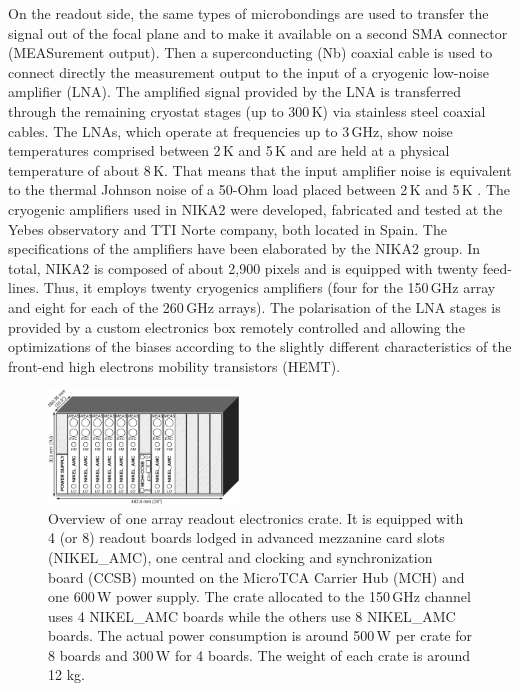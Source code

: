 \documentclass[]{aa} %
\begin{document}
On the readout side, the same types of microbondings are used to transfer the signal out of the focal plane and to make it available on a second SMA connector (MEASurement output). Then a superconducting (Nb) coaxial cable is used to connect directly the measurement output to the input of a cryogenic low-noise amplifier (LNA). The amplified signal provided by the LNA is transferred through the remaining cryostat stages (up to 300\,K) via stainless steel coaxial cables. The LNAs, which operate at frequencies up to 3\,GHz, show noise temperatures comprised between 2\,K and 5\,K and are held at a physical temperature of about 8\,K. That means that the input amplifier noise is equivalent to the thermal Johnson noise of a 50-Ohm load placed between 2\,K and 5\,K . The cryogenic amplifiers used in NIKA2 were developed, fabricated and tested at the Yebes observatory and TTI Norte company, both located in Spain. The specifications of the amplifiers have been elaborated by the NIKA2 group. In total, NIKA2 is composed of about 2,900 pixels and is equipped with twenty feed-lines. Thus, it employs twenty cryogenics amplifiers (four for the 150\,GHz array and eight for each of the 260\,GHz arrays). The polarisation of the LNA stages is provided by a custom electronics box remotely controlled and allowing the optimizations of the biases according to the slightly different characteristics of the front-end high electrons mobility transistors (HEMT). 

\begin{figure}
\begin{center}
\includegraphics[angle=0,width=0.45\textwidth]{NIKA_crate}
\caption{Overview of one array readout electronics crate.
It is equipped with 4 (or 8) readout boards lodged in advanced mezzanine card slots (NIKEL\_AMC), one central and clocking and synchronization board (CCSB) mounted on the MicroTCA Carrier Hub (MCH) and one 600\,W power supply.
The crate allocated to the 150\,GHz channel uses 4 NIKEL\_AMC boards while the others use 8 NIKEL\_AMC boards. The actual power consumption is around 500\,W per crate for 8 boards and 300\,W for 4 boards. The weight of each crate is around 12 kg.
\label{crateFig}}
\end{center}
\end{figure}
\end{document}
